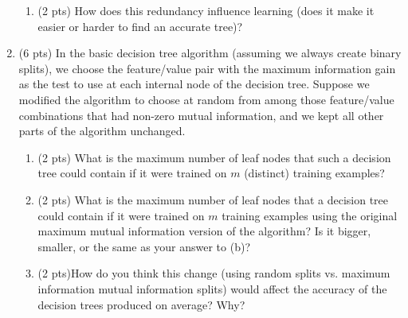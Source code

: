 \documentclass{article}
\begin{document}
\begin{enumerate}
\begin{enumerate}
\item (2 pts) How does this redundancy influence learning (does it make it easier or harder to find an accurate tree)?\\

\end{enumerate}
\item (6 pts) In the basic decision tree algorithm (assuming we always create binary splits), we choose the feature/value pair with the maximum information gain as the test to use at each internal node of the decision tree.  Suppose we modified the algorithm to choose at random from among those feature/value combinations that had non-zero mutual information, and we kept all other parts of the algorithm unchanged.

\begin{enumerate}
\item (2 pts) What is the maximum number of leaf nodes that such a
decision tree could contain if it were trained on $m$ (distinct)
training examples?


\item (2 pts) What is the maximum number of leaf nodes that a decision
tree could contain if it were trained on $m$ training
examples using the original maximum mutual information
version of the algorithm?  Is it bigger, smaller, or the
same as your answer to (b)?


\item (2 pts)How do you think this change (using random splits vs. maximum information mutual information splits) would affect the accuracy of the decision trees produced on average?  Why?


\end{enumerate}
\end{enumerate}
\end{document}
